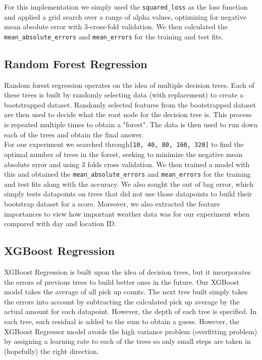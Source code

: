 \documentclass[journal, 12pt]{IEEEtran}
\newcommand{\cc}[1]{\texttt{#1}}
\begin{document}
\noindent For this implementation we simply used the \cc{squared\_loss} as the loss function and applied a grid search over a range of alpha values, optimizing for negative mean absolute error with 3-cross-fold validation. We then calculated the \cc{mean\_absolute\_errors} and \cc{mean\squared\_errors} for the training and test fits.

\subsection{Random Forest Regression}

\noindent Random forest regression operates on the idea of multiple decision trees. Each of these trees is built by randomly selecting data (with replacement) to create a bootstrapped dataset. Randomly selected features from the bootstrapped dataset are then used to decide what the root node for the decision tree is. This process is repeated multiple times to obtain a "forest". The data is then used to run down each of the trees and obtain the final answer.\\

\noindent For our experiment we searched through\cc{[10, 40, 80, 160, 320]} to find the optimal number of trees in the forest, seeking to minimize the negative mean absolute error and using 3 folds cross validation. We then trained a model with this and obtained the \cc{mean\_absolute\_errors} and \cc{mean\squared\_errors} for the training and test fits along with the accuracy. We also sought the out of bag error, which simply tests datapoints on trees that did not use those datapoints to build their bootstrap dataset for a score. Moreover, we also extracted the feature importances to view how important weather data was for our experiment when compared with day and location ID.

\subsection{XGBoost Regression}

\noindent XGBoost Regression is built upon the idea of decision trees, but it incorporates the errors of previous trees to build better ones in the future. Our XGBoost model takes the average of all pick up counts. The next tree built simply takes the errors into account by subtracting the calculated pick up average by the actual amount for each datapoint. However, the depth of each tree is specified. In each tree, each residual is added to the sum to obtain a guess. However, the XGBoost Regressor model avoids the high variance problem (overfitting problem) by assigning a learning rate to each of the trees so only small steps are taken in (hopefully) the right direction.\\
\end{document}

